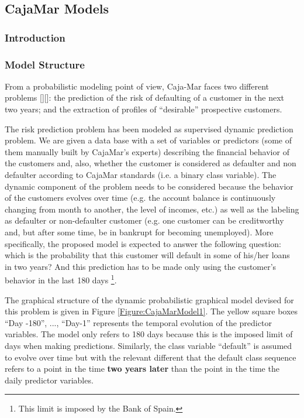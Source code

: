 \subsection{CajaMar Models}
\label{Section:CajaMarModels}

\subsubsection*{Introduction}


\subsubsection*{Model Structure}

From a probabilistic modeling point of view, Caja-Mar faces two different problems [][]: the prediction of the risk of defaulting of a customer in the next two years; and the extraction of profiles of ``desirable'' prospective customers. 

The risk prediction problem has been modeled as supervised dynamic prediction problem.  We are given a data base with a set of variables or predictors (some of them manually built by CajaMar's experts) describing the financial behavior of the customers and, also, whether the customer is considered as defaulter and non defaulter according to CajaMar standards (i.e. a binary class variable). The dynamic component of the problem needs to be considered because the behavior of the customers evolves over time (e.g. the account balance is continuously changing from month to another, the level of incomes, etc.)  as well as the labeling as defaulter or non-defaulter customer (e.g. one customer can be creditworthy and, but after some time, be in bankrupt for becoming unemployed). More specifically, the proposed model is expected to answer the following question: which is the probability that this customer will  default in some of his/her loans in two years? And this prediction has to be made only using the customer's behavior in the last 180 days \footnote{This limit is imposed by the Bank of Spain.}.

The graphical structure of the dynamic probabilistic graphical model devised for this problem is given in Figure \ref{Figure:CajaMarModel1}.  The yellow square boxes ``Day -180'', ..., ``Day-1'' represents the temporal evolution of the predictor variables. The model only refers to 180 days because this is the imposed limit of days when making predictions. Similarly, the class variable ``default'' is assumed to evolve over time but with the relevant different that the default class sequence refers to a point in the time \textbf{two years later} than  the point in the time the daily predictor variables. 


